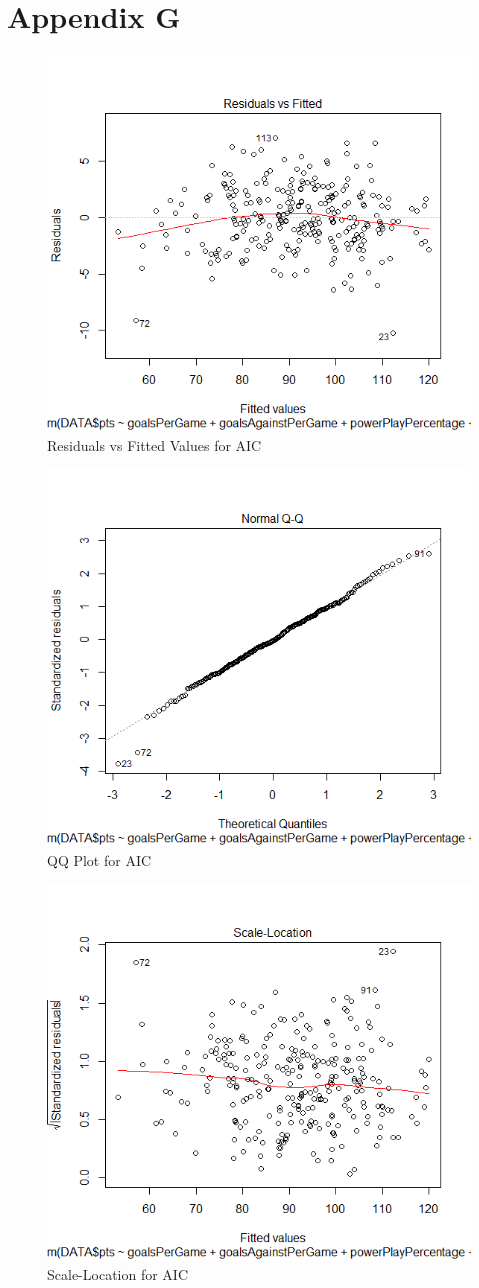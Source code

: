 \section*{Appendix G}
\newpage\normalsize
\begin{figure}
	\centering
	\includegraphics[width=0.7\linewidth]{AIC1}
	\caption{Residuals vs Fitted Values for AIC}
	\label{fig:Residuals vs Fitted Values for AIC}
\end{figure}
\begin{figure}
	\centering
	\includegraphics[width=0.7\linewidth]{AIC2}
	\caption{QQ Plot for AIC}
	\label{fig:QQ Plot for AIC}
\end{figure}
\begin{figure}
	\centering
	\includegraphics[width=0.7\linewidth]{AIC3}
	\caption{Scale-Location for AIC}
	\label{fig:Scale-Location for AIC}
\end{figure}
